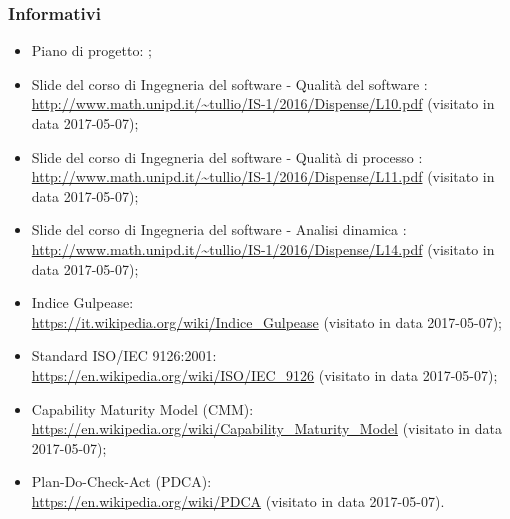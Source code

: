 \documentclass[PdQ.tex]{subfiles}
\begin{document}
		\subsubsection{Informativi}
			\begin{itemize}
				\item Piano di progetto: \PPdoc{};
				\item Slide del corso di Ingegneria del software - Qualità del software : \\
				\url{http://www.math.unipd.it/~tullio/IS-1/2016/Dispense/L10.pdf} (visitato in data 2017-05-07);
				\item Slide del corso di Ingegneria del software - Qualità di processo : \\
				\url{http://www.math.unipd.it/~tullio/IS-1/2016/Dispense/L11.pdf} (visitato in data 2017-05-07);
				\item Slide del corso di Ingegneria del software - Analisi dinamica : \\
				\url{http://www.math.unipd.it/~tullio/IS-1/2016/Dispense/L14.pdf} (visitato in data 2017-05-07);
				\item Indice Gulpease: \\
				\url{https://it.wikipedia.org/wiki/Indice_Gulpease} (visitato in data 2017-05-07);
				\item Standard ISO/IEC 9126:2001: \\
				\url{https://en.wikipedia.org/wiki/ISO/IEC_9126} (visitato in data 2017-05-07);
				\item Capability Maturity Model (CMM): \\
				\url{https://en.wikipedia.org/wiki/Capability_Maturity_Model} (visitato in data 2017-05-07);
				\item Plan-Do-Check-Act (PDCA): \\
				\url{https://en.wikipedia.org/wiki/PDCA} (visitato in data 2017-05-07).
			\end{itemize}
			
\end{document}
